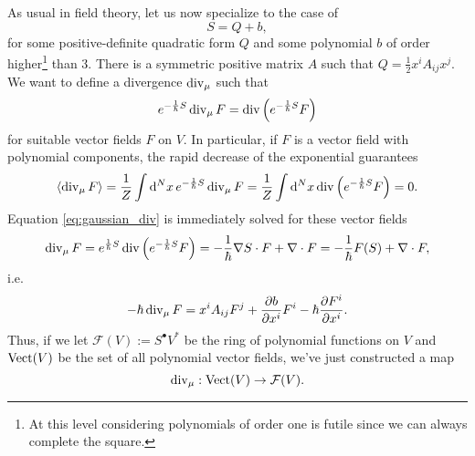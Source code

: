 As usual in field theory, let us now specialize to the case of 
\begin{equation}
S=Q+b,
\end{equation}
for some positive-definite quadratic form $Q$ and some polynomial $b$ of order higher\footnote{At this level considering polynomials of order one is futile since we can always complete the square.} than $3$. There is a symmetric positive matrix $A$ such that $Q=\frac{1}{2}x^iA_{ij}x^j$. We want to define a divergence $\operatorname{div}_\mu$ such that 
\begin{equation}\label{eq:gaussian_div}
e^{-\frac{1}{\hbar}S}\operatorname{div}_\mu F=\operatorname{div}\qty(e^{-\frac{1}{\hbar}S}F)
\end{equation}
for suitable vector fields $F$ on $V$. In particular, if $F$ is a vector field with polynomial components, the rapid decrease of the exponential guarantees
\begin{equation}\label{eq:divergences}
\ev{\Div_\mu F}=\frac{1}{Z}\int\dd[N]{x}e^{-\frac{1}{\hbar}S}\Div_\mu F=\frac{1}{Z}\int\dd[N]{x}\Div\qty(e^{-\frac{1}{\hbar}S}F)=0.
\end{equation}
Equation \eqref{eq:gaussian_div} is immediately solved for these vector fields
\begin{equation}\label{eq:divergence_formula}
\operatorname{div}_\mu F=e^{\frac{1}{\hbar}S}\operatorname{div}\qty(e^{-\frac{1}{\hbar}S}F)=-\frac{1}{\hbar}\nabla S\cdot F+\nabla\cdot F=-\frac{1}{\hbar}F(S)+\nabla\cdot F,
\end{equation}
i.e.
\begin{equation}
-\hbar\operatorname{div}_\mu F=x^iA_{ij}F^j+\pdv{b}{x^i}F^i-\hbar\pdv{F^i}{x^i}.
\end{equation}
Thus, if we let $\mathcal{F}(V):=S^\bullet V^*$ be the ring of polynomial functions on $V$ and $\operatorname{Vect}(V)$ be the set of all polynomial vector fields, we've just constructed a map
\begin{equation}
\operatorname{div}_\mu:\operatorname{Vect}(V)\rightarrow\mathcal{F}(V).
\end{equation}

